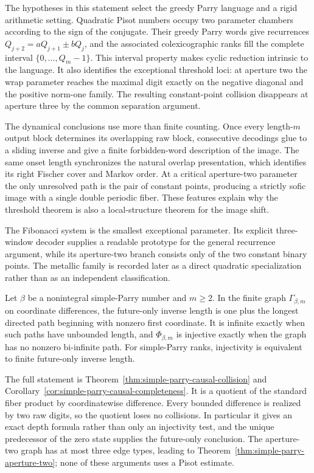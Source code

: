 The hypotheses in this statement select the greedy Parry language and a
rigid arithmetic setting.  Quadratic Pisot numbers occupy two
parameter chambers according to the sign of the conjugate.  Their greedy
Parry words give recurrences $Q_{j+2}=aQ_{j+1}\pm bQ_j$, and the associated
colexicographic ranks fill the complete interval
$\{0,\ldots,Q_m-1\}$.  This interval property makes cyclic reduction
intrinsic to the language.  It also identifies the exceptional threshold
loci: at aperture two the wrap parameter reaches the maximal digit exactly
on the negative diagonal and the positive norm-one family.  The resulting
constant-point collision disappears at aperture three by the common
separation argument.

The dynamical conclusions use more than finite counting.  Once every
length-$m$ output block determines its overlapping raw block, consecutive
decodings glue to a sliding inverse and give a finite forbidden-word
description of the image.  The same onset length synchronizes the natural
overlap presentation, which identifies its right Fischer cover and Markov
order.  At a critical aperture-two parameter the only unresolved path is the
pair of constant points, producing a strictly sofic image with a single
double periodic fiber.  These features explain why the threshold theorem is
also a local-structure theorem for the image shift.

The Fibonacci system is the smallest exceptional parameter.  Its explicit
three-window decoder supplies a readable prototype for the general
recurrence argument, while its aperture-two branch consists only of the two
constant binary points.  The metallic family is recorded later as a direct
quadratic specialization rather than as an independent classification.

\begin{introtheorem}
Let $\beta$ be a nonintegral simple-Parry number and $m\ge2$.  In the finite
graph $\Gamma_{\beta,m}$ on coordinate differences, the future-only inverse
length is one plus the longest directed path beginning with nonzero first
coordinate.  It is infinite exactly when such paths have unbounded length,
and $\Phi_{\beta,m}$ is injective exactly when the graph has no nonzero
bi-infinite path.  For simple-Parry ranks, injectivity is equivalent to
finite future-only inverse length.
\end{introtheorem}

The full statement is Theorem~\ref{thm:simple-parry-causal-collision} and
Corollary~\ref{cor:simple-parry-causal-completeness}.  It is a quotient of
the standard fiber product by coordinatewise difference.  Every bounded
difference is realized by two raw digits, so the quotient loses no
collisions.  In particular it gives an exact depth formula rather than only
an injectivity test, and the unique predecessor of the zero state supplies
the future-only conclusion.  The aperture-two graph has at most three edge
types, leading to Theorem~\ref{thm:simple-parry-aperture-two}; none of these
arguments uses a Pisot estimate.

